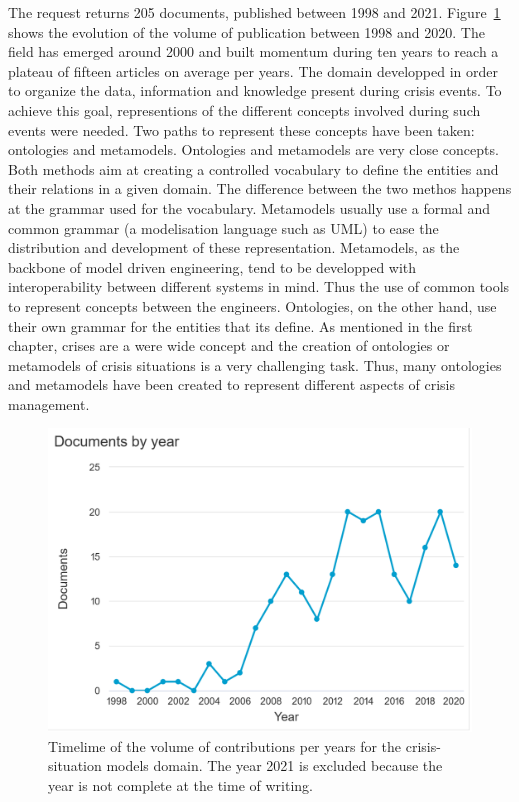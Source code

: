 The request returns 205 documents, published between 1998 and 2021.
Figure~\ref{literature:situation-models-hist} shows the evolution of the volume of publication between 1998 and 2020.
The field has emerged around 2000 and built momentum during ten years to reach a plateau of fifteen articles on average per years.
The domain developped in order to organize the data, information and knowledge present during crisis events.
To achieve this goal, representions of the different concepts involved during such events were needed.
Two paths to represent these concepts have been taken: ontologies and metamodels.
Ontologies and metamodels are very close concepts.
Both methods aim at creating a controlled vocabulary to define the entities and their relations in a given domain.
The difference between the two methos happens at the grammar used for the vocabulary.
Metamodels usually use a formal and common grammar (a modelisation language such as UML) to ease the distribution and development of these representation.
Metamodels, as the backbone of model driven engineering, tend to be developped with interoperability between different systems in mind.
Thus the use of common tools to represent concepts between the engineers.
Ontologies, on the other hand, use their own grammar for the entities that its define.
As mentioned in the first chapter, crises are a were wide concept and the creation of ontologies or metamodels of crisis situations is a very challenging task.
Thus, many ontologies and metamodels have been created to represent different aspects of crisis management.

\begin{figure}[htb]
    \includegraphics[width=\textwidth]{figures/chap-2/situation-models-hist.pdf}
    \caption{Timelime of the volume of contributions per years for the crisis-situation models domain. The year 2021 is excluded because the year is not complete at the time of writing.}
    \label{literature:situation-models-hist}
\end{figure}

